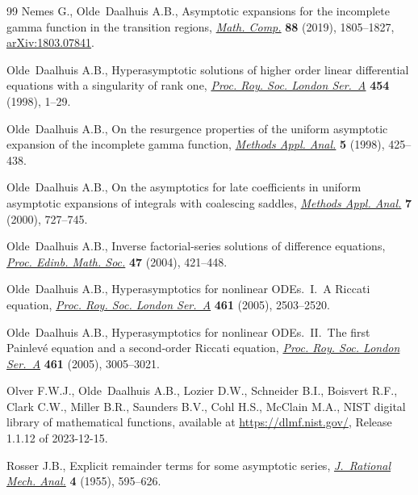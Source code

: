 \documentclass[pdftex]{sigma}
\numberwithin{equation}{section}
\begin{document}
\begin{thebibliography}{99}
Nemes G., Olde~Daalhuis A.B., Asymptotic expansions for the incomplete gamma
 function in the transition regions, \href{https://doi.org/10.1090/mcom/3391}{\textit{Math. Comp.}} \textbf{88} (2019),
 1805--1827, \href{https://arxiv.org/abs/1803.07841}{arXiv:1803.07841}.

Olde~Daalhuis A.B., Hyperasymptotic solutions of higher order linear
 differential equations with a singularity of rank one, \href{https://doi.org/10.1098/rspa.1998.0145}{\textit{Proc. Roy.
 Soc. London Ser.~A}} \textbf{454} (1998), 1--29.

Olde~Daalhuis A.B., On the resurgence properties of the uniform asymptotic
 expansion of the incomplete gamma function, \href{https://doi.org/10.4310/MAA.1998.v5.n4.a7}{\textit{Methods Appl. Anal.}}
 \textbf{5} (1998), 425--438.

Olde~Daalhuis A.B., On the asymptotics for late coefficients in uniform
 asymptotic expansions of integrals with coalescing saddles,  \href{https://doi.org/10.4310/MAA.2000.v7.n4.a7}{\textit{Methods
 Appl. Anal.}} \textbf{7} (2000), 727--745.

Olde~Daalhuis A.B., Inverse factorial-series solutions of difference equations,
  \href{https://doi.org/10.1017/S0013091503000609}{\textit{Proc. Edinb. Math. Soc.}} \textbf{47} (2004), 421--448.

Olde~Daalhuis A.B., Hyperasymptotics for nonlinear {ODE}s.~{I}.~{A} {R}iccati
 equation, \href{https://doi.org/10.1098/rspa.2005.1462}{\textit{Proc. Roy. Soc. London Ser.~A}} \textbf{461} (2005),
 2503--2520.

Olde~Daalhuis A.B., Hyperasymptotics for nonlinear {ODE}s.~{II}.~{T}he first
 {P}ainlev\'e equation and a second-order {R}iccati equation, \href{https://doi.org/10.1098/rspa.2005.1463}{\textit{Proc.
 Roy. Soc. London Ser.~A}} \textbf{461} (2005), 3005--3021.

Olver F.W.J., Olde~Daalhuis A.B., Lozier D.W., Schneider B.I., Boisvert R.F.,
 Clark C.W., Miller B.R., Saunders B.V., Cohl H.S., McClain M.A., NIST digital
 library of mathematical functions, available at \url{https://dlmf.nist.gov/},
 Release 1.1.12 of 2023-12-15.

Rosser J.B., Explicit remainder terms for some asymptotic series,
 \href{https://doi.org/10.1512/iumj.1955.4.54021}{\textit{J.~Rational Mech. Anal.}} \textbf{4} (1955), 595--626.


\end{thebibliography}
\end{document}
